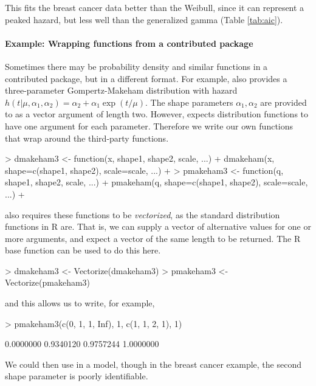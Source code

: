 \documentclass[nojss,nofooter]{jss}
\begin{document}
This fits the breast cancer data better than the Weibull, since it can
represent a peaked hazard, but less well than the generalized gamma (Table \ref{tab:aic}).


\paragraph{Example: Wrapping functions from a contributed package}

Sometimes there may be probability density and similar functions in a
contributed package, but in a different format.  For example,
 also provides a three-parameter Gompertz-Makeham
distribution with hazard $h(t|\mu,\alpha_1,\alpha_2)= \alpha_2 + \alpha_1 \exp(t/\mu)$.
The shape parameters $\alpha_1,\alpha_2$ are provided to 
 as a vector argument of length two.  However, 
expects distribution functions to have one argument for each
parameter.  Therefore we write our own functions that wrap around 
the third-party functions.
\begin{Schunk}
\begin{Sinput}
> dmakeham3 <- function(x, shape1, shape2, scale, ...)  {
+     dmakeham(x, shape=c(shape1, shape2), scale=scale, ...)
+ }
> pmakeham3 <- function(q, shape1, shape2, scale, ...)  {
+     pmakeham(q, shape=c(shape1, shape2), scale=scale, ...)
+ }
\end{Sinput}
\end{Schunk}
 also requires these functions to be
\emph{vectorized}, as the standard distribution functions in R are.
That is, we can supply a vector of alternative values for one or more
arguments, and expect a vector of the same length to be returned.  The
R base function  can be used to do this here.
\begin{Schunk}
\begin{Sinput}
> dmakeham3 <- Vectorize(dmakeham3) 
> pmakeham3 <- Vectorize(pmakeham3)
\end{Sinput}
\end{Schunk}
and this allows us to write, for example, 
\begin{Schunk}
\begin{Sinput}
> pmakeham3(c(0, 1, 1, Inf), 1, c(1, 1, 2, 1), 1)
\end{Sinput}
\begin{Soutput}
[1] 0.0000000 0.9340120 0.9757244 1.0000000
\end{Soutput}
\end{Schunk}
We could then use 
in a  model, though in the breast cancer example,
the second shape parameter is poorly identifiable.
\end{document}
